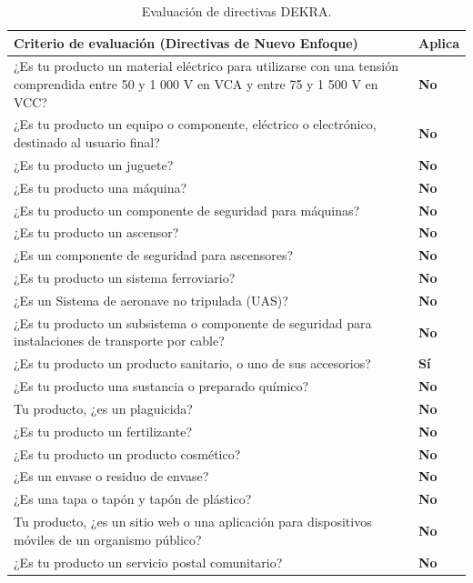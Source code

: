 \documentclass[11pt,a4paper]{article}
\begin{document}
\vspace{0.6cm}

\begin{table}[H]
    
\noindent
{\renewcommand{\tabularxcolumn}[1]{m{#1}} %
\renewcommand{\arraystretch}{1.5}
\begin{tabularx}{\textwidth}{|>{\columncolor{gray!15}\centering\arraybackslash\small}X|>{\centering\arraybackslash\bfseries}m{2.5cm}|}
\hline
\rowcolor{ArthroNavy}
\color{white}\textbf{Criterio de evaluación (Directivas de Nuevo Enfoque)} & \color{white}\textbf{Aplica} \\
\hline
¿Es tu producto un material eléctrico para utilizarse con una tensión comprendida entre 50 y 1 000 V en VCA y entre 75 y 1 500 V en VCC? & No \\ \hline
¿Es tu producto un equipo o componente, eléctrico o electrónico, destinado al usuario final? & No \\ \hline
¿Es tu producto un juguete? & No \\ \hline
¿Es tu producto una máquina? & No \\ \hline
¿Es tu producto un componente de seguridad para máquinas? & No \\ \hline
¿Es tu producto un ascensor? & No \\ \hline
¿Es un componente de seguridad para ascensores? & No \\ \hline
¿Es tu producto un sistema ferroviario? & No \\ \hline
¿Es un Sistema de aeronave no tripulada (UAS)? & No \\ \hline
¿Es tu producto un subsistema o componente de seguridad para instalaciones de transporte por cable? & No \\ \hline
\rowcolor{ArthroTeal!10} %
¿Es tu producto un producto sanitario, o uno de sus accesorios? & \textcolor{ArthroTeal}{Sí} \\ \hline
¿Es tu producto una sustancia o preparado químico? & No \\ \hline
Tu producto, ¿es un plaguicida? & No \\ \hline
¿Es tu producto un fertilizante? & No \\ \hline
¿Es tu producto un producto cosmético? & No \\ \hline
¿Es un envase o residuo de envase? & No \\ \hline
¿Es una tapa o tapón y tapón de plástico? & No \\ \hline
Tu producto, ¿es un sitio web o una aplicación para dispositivos móviles de un organismo público? & No \\ \hline
¿Es tu producto un servicio postal comunitario? & No \\ \hline
\end{tabularx}}
\centering
    \caption{Evaluación de directivas DEKRA.}
    \label{tab:evaluacion_dekra}
    \vspace{0.3cm} %
\end{table}
\vspace{0.8cm}
\end{document}
